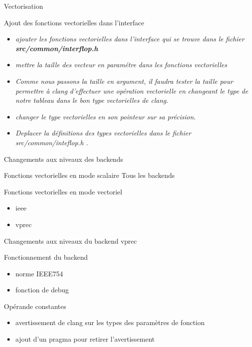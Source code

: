 \documentclass{beamer}
\begin{document}
\begin{frame}{Vectorisation}         
\begin{block}{Ajout des fonctions vectorielles dans l’interface}
  \begin{itemize}
  \item\textit{ajouter les fonctions vectorielles dans l'interface qui se trouve dans le fichier \textbf{src/common/interflop.h}} 
 \item\textit{mettre la taille des vecteur en paramétre dans les fonctions vectorielles}
 \item\textit{Comme nous passons la taille en argument, il faudra tester la taille pour permettre à clang d’effectuer une opération vectorielle en changeant le type de notre tableau dans le bon type vectorielles de clang.}
 \item\textit{changer le type vectorielles en son pointeur sur sa précision.}
 \item\textit{Deplacer la définitions des types vectorielles dans le fichier src/common/inteflop.h .}
   \end{itemize}
    
\end{block}
\end{frame}

\begin{frame}{Changements aux niveaux des backends}

  \begin{block}{Fonctions vectorielles en mode scalaire}
    Tous les backends
  \end{block}

  \begin{block}{Fonctions vectorielles en mode vectoriel}
    \begin{itemize}
    \item ieee
    \item vprec
    \end{itemize}
  \end{block}

\end{frame}

\begin{frame}{Changements aux niveaux du backend vprec}

  \begin{block}{Fonctionnement du backend}
    \begin{itemize}
    \item norme IEEE754
    \item fonction de debug
    \end{itemize}
  \end{block}

  \begin{block}{Opérande constantes}
    \begin{itemize}
    \item avertissement de clang sur les types des paramètres de fonction
    \item ajout d'un pragma pour retirer l'avertissement
    \end{itemize}
  \end{block}

\end{frame}
\end{document}
